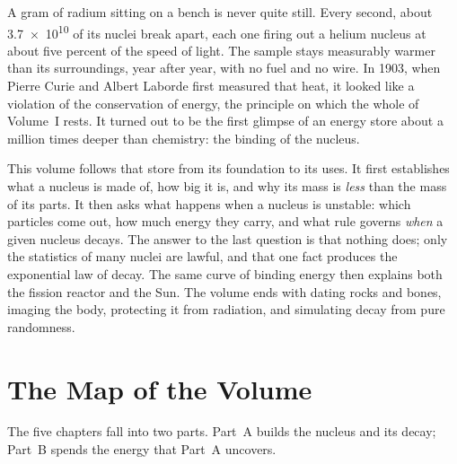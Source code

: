 
A gram of radium sitting on a bench is never quite still. Every second, about \num{3.7e10} of its nuclei
break apart, each one firing out a helium nucleus at about five percent of the speed of light. The
sample stays measurably warmer than its surroundings, year after year, with no fuel and no wire. In
1903, when Pierre Curie and Albert Laborde first measured that heat, it looked like a violation of the
conservation of energy, the principle on which the whole of Volume~I rests. It turned out to be the
first glimpse of an energy store about a million times deeper than chemistry: the binding of the
nucleus.

This volume follows that store from its foundation to its uses. It first establishes what a nucleus is
made of, how big it is, and why its mass is \emph{less} than the mass of its parts. It then asks what
happens when a nucleus is unstable: which particles come out, how much energy they carry, and what rule
governs \emph{when} a given nucleus decays. The answer to the last question is that nothing does; only
the statistics of many nuclei are lawful, and that one fact produces the exponential law of decay. The
same curve of binding energy then explains both the fission reactor and the Sun. The volume ends with
dating rocks and bones, imaging the body, protecting it from radiation, and simulating decay from pure
randomness.

\section*{The Map of the Volume}

The five chapters fall into two parts. Part~A builds the nucleus and its decay; Part~B spends the
energy that Part~A uncovers.

